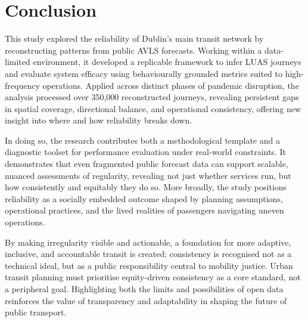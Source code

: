 \section*{Conclusion}

    This study explored the reliability of Dublin’s main transit network by reconstructing patterns from public AVLS forecasts. Working within a data-limited environment, it developed a replicable framework to infer LUAS journeys and evaluate system efficacy using behaviourally grounded metrics suited to high-frequency operations. Applied across distinct phases of pandemic disruption, the analysis processed over 350,000 reconstructed journeys, revealing persistent gaps in spatial coverage, directional balance, and operational consistency, offering new insight into where and how reliability breaks down.

    In doing so, the research contributes both a methodological template and a diagnostic toolset for performance evaluation under real-world constraints. It demonstrates that even fragmented public forecast data can support scalable, nuanced assessments of regularity, revealing not just whether services run, but how consistently and equitably they do so. More broadly, the study positions reliability as a socially embedded outcome shaped by planning assumptions, operational practices, and the lived realities of passengers navigating uneven operations.

    By making irregularity visible and actionable, a foundation for more adaptive, inclusive, and accountable transit is created; consistency is recognised not as a technical ideal, but as a public responsibility central to mobility justice. Urban transit planning must prioritise equity-driven consistency as a core standard, not a peripheral goal. Highlighting both the limits and possibilities of open data reinforces the value of transparency and adaptability in shaping the future of public transport.

